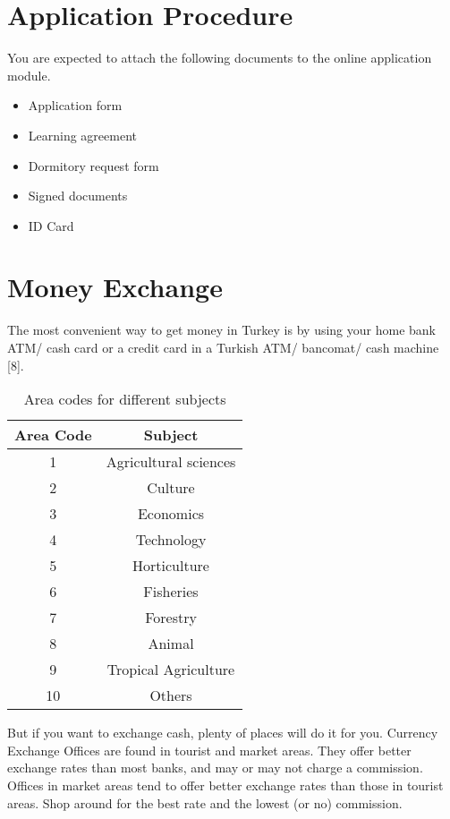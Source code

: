 \section{Application Procedure}
You are expected to attach the following documents to the online application module.

\begin{itemize}
\item Application form
\item Learning agreement
\item Dormitory request form 
\item Signed documents
\item ID Card
\end{itemize}

\section{Money Exchange}
The most convenient way to get money  in Turkey is by using your home bank ATM/ cash card or a credit card in a Turkish ATM/ bancomat/ cash machine [8].

\begin{table}[!ht]
\caption{Area codes for different subjects}
\centering
\begin{tabular}{|c|c|}
\hline
\textbf{Area Code} & \textbf{Subject}      \\ \hline
1                  & Agricultural sciences \\ \hline
2                  & Culture               \\ \hline
3                  & Economics             \\ \hline
4                  & Technology            \\ \hline
5                  & Horticulture          \\ \hline
6                  & Fisheries             \\ \hline
7                  & Forestry              \\ \hline
8                  & Animal                \\ \hline
9                  & Tropical Agriculture  \\ \hline
10                 & Others                \\ \hline
\end{tabular}
\end{table}

But if you want to exchange cash, plenty of places will do it for you. Currency Exchange Offices  are found in tourist and market areas. They offer better exchange rates than most banks, and may or may not charge a commission. Offices in market areas tend to offer better exchange rates than those in tourist areas. Shop around for the best rate and the lowest (or no) commission.

